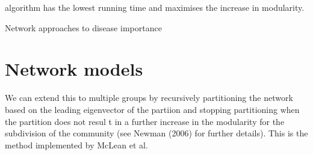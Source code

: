 algorithm has the lowest running time and maximises the increase in modularity.




 Network approaches to disease
importance

\section{Network models}




We can extend this to multiple groups by recursively partitioning the network based on the leading eigenvector of the partiion and stopping partitioning when the partition does not resul
t in a further increase in the modularity for the subdivision of the community (see Newman (2006)\cite{newman2006finding}  for further details). This is the method implemented by McLean et al. \cite{mclean2016improved} 

